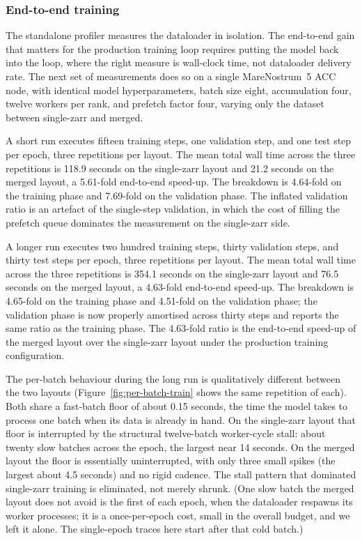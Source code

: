 \documentclass[12pt,a4paper]{article}
\begin{document}
\subsubsection{End-to-end training}\label{sec:end-to-end}

The standalone profiler measures the dataloader in isolation. The end-to-end gain that
matters for the production training loop requires putting the model back into the loop, where
the right measure is wall-clock time, not dataloader delivery rate. The next set of
measurements does so on a single MareNostrum~5 ACC node, with identical model
hyperparameters, batch size eight, accumulation four, twelve workers per rank, and prefetch
factor four, varying only the dataset between single-zarr and merged.

A short run executes fifteen training steps, one validation step, and one test step per
epoch, three repetitions per layout. The mean total wall time across the three repetitions
is 118.9 seconds on the single-zarr layout and 21.2 seconds on the merged layout, a
5.61-fold end-to-end speed-up. The breakdown is 4.64-fold on the training phase and
7.69-fold on the validation phase. The inflated validation ratio is an artefact of the
single-step validation, in which the cost of filling the prefetch queue dominates the
measurement on the single-zarr side.

A longer run executes two hundred training steps, thirty validation steps, and thirty test
steps per epoch, three repetitions per layout. The mean total wall time across the three
repetitions is 354.1 seconds on the single-zarr layout and 76.5 seconds on the merged
layout, a 4.63-fold end-to-end speed-up. The breakdown is 4.65-fold on the training phase
and 4.51-fold on the validation phase; the validation phase is now properly amortised
across thirty steps and reports the same ratio as the training phase. The 4.63-fold ratio
is the end-to-end speed-up of the merged layout over the single-zarr layout under the
production training configuration.

The per-batch behaviour during the long run is qualitatively different between the two
layouts (Figure~\ref{fig:per-batch-train} shows the same repetition of each). Both share a
fast-batch floor of about 0.15 seconds, the time the model takes to process one batch when
its data is already in hand. On the single-zarr layout that floor is interrupted by the
structural twelve-batch worker-cycle stall: about twenty slow batches across the epoch, the
largest near 14 seconds. On the merged layout the floor is essentially uninterrupted, with
only three small spikes (the largest about 4.5 seconds) and no rigid cadence. The stall
pattern that dominated single-zarr training is eliminated, not merely shrunk. (One slow
batch the merged layout does not avoid is the first of each epoch, when the dataloader
respawns its worker processes; it is a once-per-epoch cost, small in the overall budget, and
we left it alone. The single-epoch traces here start after that cold batch.)
\end{document}

